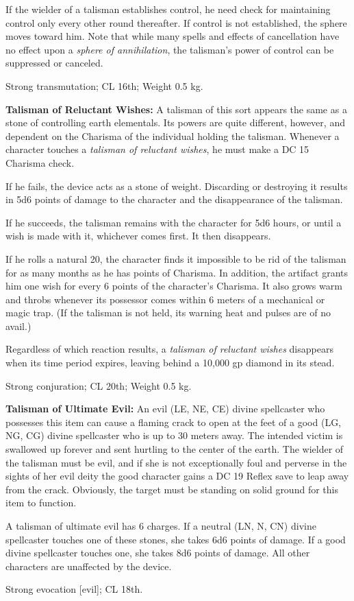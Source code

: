 If the wielder of a talisman establishes control, he need check for maintaining control only every other round thereafter. If control is not established, the sphere moves toward him. Note that while many spells and effects of cancellation have no effect upon a \emph{sphere of annihilation}, the talisman's power of control can be suppressed or canceled.

Strong transmutation; CL 16th; Weight 0.5 kg.

\textbf{Talisman of Reluctant Wishes:} A talisman of this sort appears the same as a stone of controlling earth elementals. Its powers are quite different, however, and dependent on the Charisma of the individual holding the talisman. Whenever a character touches a \emph{talisman of reluctant wishes}, he must make a DC 15 Charisma check.

If he fails, the device acts as a stone of weight. Discarding or destroying it results in 5d6 points of damage to the character and the disappearance of the talisman.

If he succeeds, the talisman remains with the character for 5d6 hours, or until a wish is made with it, whichever comes first. It then disappears.

If he rolls a natural 20, the character finds it impossible to be rid of the talisman for as many months as he has points of Charisma. In addition, the artifact grants him one wish for every 6 points of the character's Charisma. It also grows warm and throbs whenever its possessor comes within 6 meters of a mechanical or magic trap. (If the talisman is not held, its warning heat and pulses are of no avail.)

Regardless of which reaction results, a \emph{talisman of reluctant wishes} disappears when its time period expires, leaving behind a 10,000 gp diamond in its stead.

Strong conjuration; CL 20th; Weight 0.5 kg.

\textbf{Talisman of Ultimate Evil:} An evil (LE, NE, CE) divine spellcaster who possesses this item can cause a flaming crack to open at the feet of a good (LG, NG, CG) divine spellcaster who is up to 30 meters away. The intended victim is swallowed up forever and sent hurtling to the center of the earth. The wielder of the talisman must be evil, and if she is not exceptionally foul and perverse in the sights of her evil deity the good character gains a DC 19 Reflex save to leap away from the crack. Obviously, the target must be standing on solid ground for this item to function.

A talisman of ultimate evil has 6 charges. If a neutral (LN, N, CN) divine spellcaster touches one of these stones, she takes 6d6 points of damage. If a good divine spellcaster touches one, she takes 8d6 points of damage. All other characters are unaffected by the device.

Strong evocation [evil]; CL 18th.
